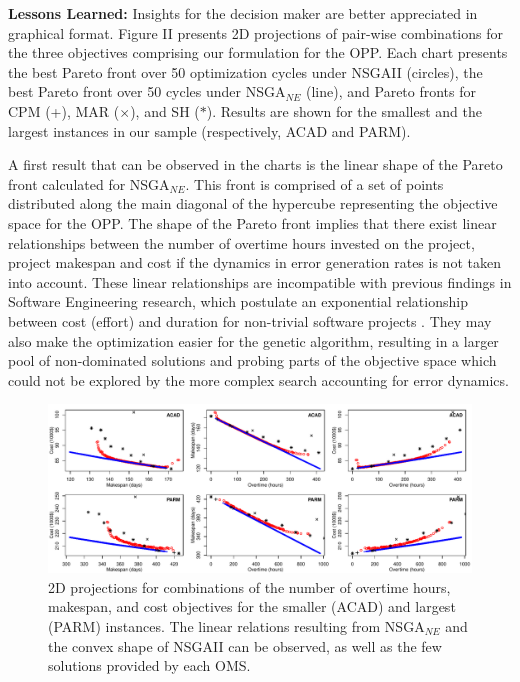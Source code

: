 \documentclass[conference]{IEEEtran}
\begin{document}
\vspace{3px}
\noindent
\textbf{Lessons Learned:} Insights for the decision maker are better appreciated in graphical format. Figure II presents 2D projections of pair-wise combinations for the three objectives comprising our formulation for the OPP. Each chart presents the best Pareto front over 50 optimization cycles under NSGAII (circles), the best Pareto front over 50 cycles under NSGA$_{NE}$ (line), and Pareto fronts for CPM (+), MAR ($\times$), and SH ($\ast$). Results are shown for the smallest and the largest instances in our sample (respectively, ACAD and PARM).

A first result that can be observed in the charts is the linear shape of the Pareto front calculated for NSGA$_{NE}$. This front is comprised of a set of points distributed along the main diagonal of the hypercube representing the objective space for the OPP. The shape of the Pareto front implies that there exist linear relationships between the number of overtime hours invested on the project, project makespan and cost if the dynamics in error generation rates is not taken into account. These linear relationships are incompatible with previous findings in Software Engineering research, which postulate an exponential relationship between cost (effort) and duration for non-trivial software projects \cite{Boehm:1981}. They may also make the optimization easier for the genetic algorithm, resulting in a larger pool of non-dominated solutions and probing parts of the objective space which could not be explored by the more complex search accounting for error dynamics.

\begin{figure}
\centering
\includegraphics[scale=0.65]{2dplots2.pdf}
\caption{2D projections for combinations of the number of overtime hours, makespan, and cost objectives for the smaller (ACAD) and largest (PARM) instances. The linear relations resulting from NSGA$_{NE}$ and the convex shape of NSGAII can be observed, as well as the few solutions provided by each OMS.}
\end{figure}
\end{document}
